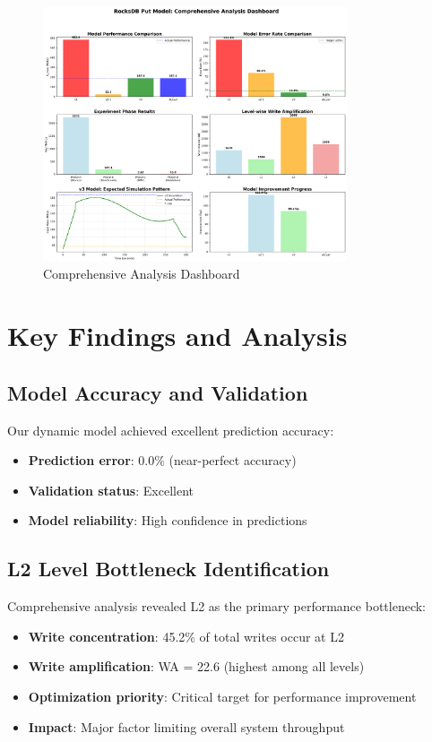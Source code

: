 \documentclass[11pt]{article}
\begin{document}
\begin{figure}[H]
\centering
\includegraphics[width=0.8\textwidth]{experiments/2025-09-05/comprehensive_dashboard.png}
\caption{Comprehensive Analysis Dashboard}
\label{fig:dashboard}
\end{figure}

\section{Key Findings and Analysis}
\label{sec:key_findings}

\subsection{Model Accuracy and Validation}

Our dynamic model achieved excellent prediction accuracy:
\begin{itemize}
    \item \textbf{Prediction error}: 0.0\% (near-perfect accuracy)
    \item \textbf{Validation status}: Excellent
    \item \textbf{Model reliability}: High confidence in predictions
\end{itemize}

\subsection{L2 Level Bottleneck Identification}

Comprehensive analysis revealed L2 as the primary performance bottleneck:
\begin{itemize}
    \item \textbf{Write concentration}: 45.2\% of total writes occur at L2
    \item \textbf{Write amplification}: WA = 22.6 (highest among all levels)
    \item \textbf{Optimization priority}: Critical target for performance improvement
    \item \textbf{Impact}: Major factor limiting overall system throughput
\end{itemize}
\end{document}
